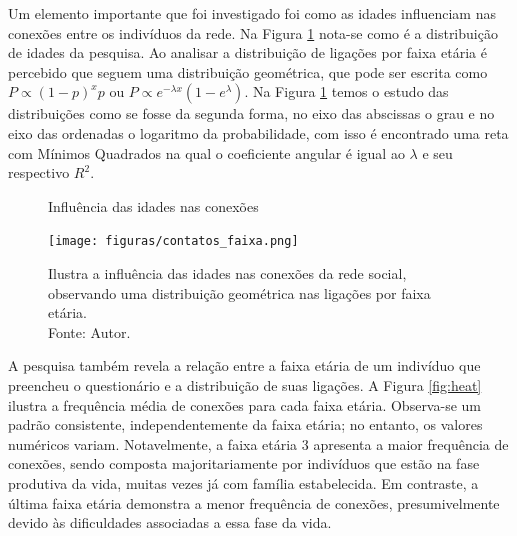 Um elemento importante que foi investigado foi como as idades influenciam nas conexões entre os indivíduos da rede. Na Figura \ref{fig:contatos_faixa} nota-se como é a distribuição de idades da pesquisa. Ao analisar a distribuição de ligações por faixa etária é percebido que seguem uma distribuição geométrica, que pode ser escrita como $P \propto (1 - p)^xp$ ou $P \propto e^{-\lambda x}(1 - e^\lambda)$. Na Figura \ref{fig:contatos_faixa} temos o estudo das distribuições como se fosse da segunda forma, no eixo das abscissas o grau e no eixo das ordenadas o logaritmo da probabilidade, com isso é encontrado uma reta com Mínimos Quadrados na qual o coeficiente angular é igual ao $\lambda$ e seu respectivo $R^2$. 

\begin{figure}[H]
    \centering
    \captionsetup{font=normalsize,skip=0.8pt,singlelinecheck=on,labelsep=endash}
    \caption{Influência das idades nas conexões}
    \texttt{[image: figuras/contatos\_faixa.png]}
    \captionsetup{font=small,justification=justified}
    \caption*{Ilustra a influência das idades nas 
    conexões da rede social, observando uma distribuição geométrica nas ligações por faixa etária.\\ Fonte: Autor.}
    \label{fig:contatos_faixa}
\end{figure}

A pesquisa também revela a relação entre a faixa etária de um indivíduo que preencheu o questionário e a distribuição de suas ligações. A Figura \ref{fig:heat} ilustra a frequência média de conexões para cada faixa etária. Observa-se um padrão consistente, independentemente da faixa etária; no entanto, os valores numéricos variam. Notavelmente, a faixa etária 3 apresenta a maior frequência de conexões, sendo composta majoritariamente por indivíduos que estão na fase produtiva da vida, muitas vezes já com família estabelecida. Em contraste, a última faixa etária demonstra a menor frequência de conexões, presumivelmente devido às dificuldades associadas a essa fase da vida.

